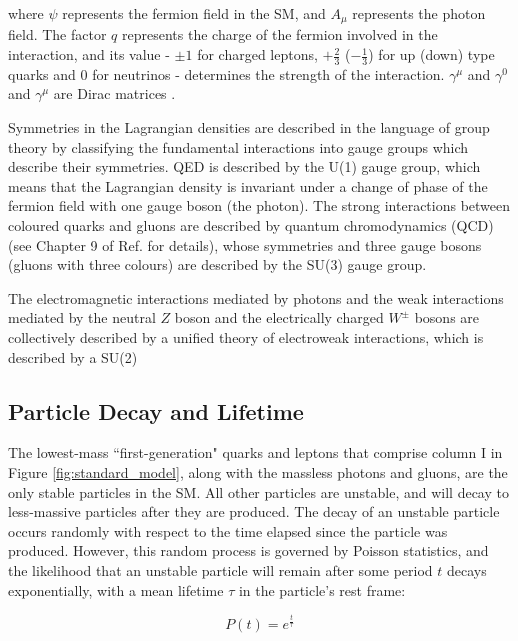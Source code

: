 \noindent where \(\psi\) represents the fermion field in the SM, and \(A_\mu\) represents the photon field. The factor \(q\) represents the charge of the fermion involved in the interaction, and its value - \(\pm1\) for charged leptons, \(+\frac{2}{3}\) (\(-\frac{1}{3}\)) for up (down) type quarks and 0 for neutrinos - determines the strength of the interaction. \(\gamma^\mu\) and \(\gamma^0\) and \(\gamma^\mu\) are Dirac matrices \cite{Griffiths_2008}.

Symmetries in the Lagrangian densities are described in the language of group theory by classifying the fundamental interactions into gauge groups which describe their symmetries. QED is described by the U(1) gauge group, which means that the Lagrangian density is invariant under a change of phase of the fermion field \cite{electroweak_2012} with one gauge boson (the photon). The strong interactions between coloured quarks and gluons are described by quantum chromodynamics (QCD) (see Chapter 9 of Ref. \cite{PDG_2018} for details), whose symmetries and three gauge bosons (gluons with three colours) are described by the SU(3) gauge group. 

The electromagnetic interactions mediated by photons and the weak interactions mediated by the neutral \(Z\) boson and the electrically charged \(W^{\pm}\) bosons are collectively described by a unified theory of electroweak interactions, which is described by a SU(2)

\subsection{Particle Decay and Lifetime}

The lowest-mass ``first-generation" quarks and leptons that comprise column I in Figure \ref{fig:standard_model}, along with the massless photons and gluons, are the only stable particles in the SM. All other particles are unstable, and will decay to less-massive particles after they are produced. The decay of an unstable particle occurs randomly with respect to the time elapsed since the particle was produced. However, this random process is governed by Poisson statistics, and the likelihood that an unstable particle will remain after some period \(t\) decays exponentially, with a mean lifetime \(\tau\) in the particle's rest frame:

\begin{equation}
\label{eq:particle_decay}
P(t) = e^{\frac{t}{\tau}}
\end{equation}

